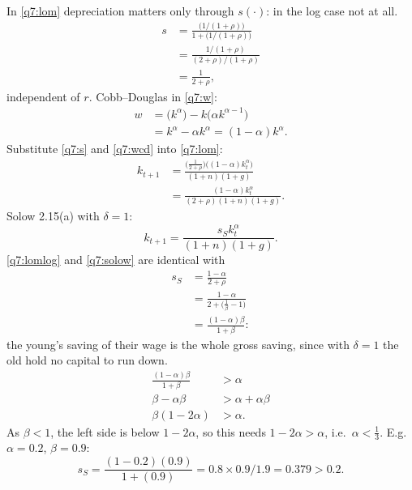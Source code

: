 \begin{sol}
In \eqref{q7:lom} depreciation matters only through $s(\cdot)$: in the log case not at all.
\begin{align}
s &= \frac{\big(1/(1+\rho)\big)}{1+\big(1/(1+\rho)\big)}\nonumber\\
&= \frac{1/(1+\rho)}{(2+\rho)/(1+\rho)}\nonumber\\
&= \frac1{2+\rho}, \label{q7:s}
\end{align}
independent of $r$. Cobb--Douglas in \eqref{q7:w}:
\begin{align}
w &= \big(k^\alpha\big)-k\big(\alpha k^{\alpha-1}\big)\nonumber\\
&= k^\alpha-\alpha k^\alpha=(1-\alpha)k^\alpha. \label{q7:wcd}
\end{align}
Substitute \eqref{q7:s} and \eqref{q7:wcd} into \eqref{q7:lom}:
\begin{align}
k_{t+1} &= \frac{\big(\frac1{2+\rho}\big)\big((1-\alpha)k_t^\alpha\big)}{(1+n)(1+g)}\nonumber\\
&= \frac{(1-\alpha)k_t^\alpha}{(2+\rho)(1+n)(1+g)}. \label{q7:lomlog}
\end{align}
Solow 2.15(a) with $\delta=1$:
\begin{equation}
k_{t+1}=\frac{s_Sk_t^\alpha}{(1+n)(1+g)}. \label{q7:solow}
\end{equation}
\eqref{q7:lomlog} and \eqref{q7:solow} are identical with
\begin{align}
s_S &= \frac{1-\alpha}{2+\rho}\nonumber\\
&= \frac{1-\alpha}{2+\big(\frac1\beta-1\big)}\nonumber\\
&= \frac{(1-\alpha)\beta}{1+\beta}: \label{q7:sS}
\end{align}
the young's saving of their wage is the whole gross saving, since with $\delta=1$ the old hold no capital to run down.
\begin{align*}
\frac{(1-\alpha)\beta}{1+\beta} &> \alpha\\
\beta-\alpha\beta &> \alpha+\alpha\beta\\
\beta(1-2\alpha) &> \alpha.
\end{align*}
As $\beta<1$, the left side is below $1-2\alpha$, so this needs $1-2\alpha>\alpha$, i.e.\ $\alpha<\frac13$. E.g.\ $\alpha=0.2$, $\beta=0.9$:
\[
s_S=\frac{(1-0.2)(0.9)}{1+(0.9)}=0.8\times0.9/1.9=0.379>0.2 .
\]
\end{sol}
